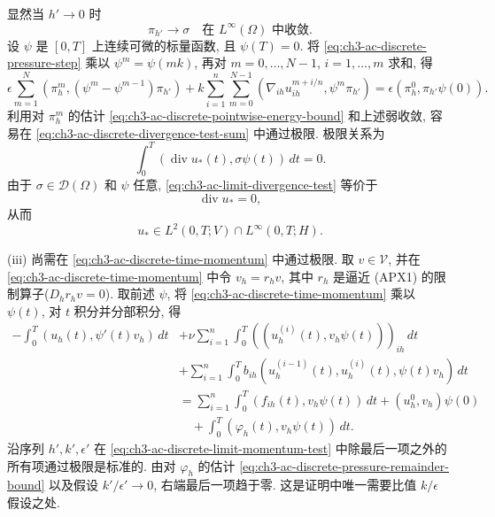 \begin{Proof}
\hypertarget{chapter-03-page-324}{}
显然当 $h'\to0$ 时
\begin{equation}
\pi_{h'}\longrightarrow\sigma
\quad\text{在 }L^\infty(\Omega)\text{ 中收敛}.
\label{eq:ch3-ac-test-pressure-convergence}
\end{equation}
设 $\psi$ 是 $[0,T]$ 上连续可微的标量函数, 且 $\psi(T)=0$. 将 \eqref{eq:ch3-ac-discrete-pressure-step} 乘以 $\psi^m=\psi(mk)$, 再对 $m=0,\ldots,N-1$, $i=1,\ldots,m$ 求和, 得
\begin{equation}
\epsilon\sum_{m=1}^N
(\pi_h^m,(\psi^m-\psi^{m-1})\pi_{h'})
+k\sum_{i=1}^n\sum_{m=0}^{N-1}
(\nabla_{ih}u_{ih}^{m+i/n},\psi^m\pi_{h'})
=\epsilon(\pi_h^0,\pi_{h'}\psi(0)).
\label{eq:ch3-ac-discrete-divergence-test-sum}
\end{equation}
利用对 $\pi_h^m$ 的估计 \eqref{eq:ch3-ac-discrete-pointwise-energy-bound} 和上述弱收敛, 容易在 \eqref{eq:ch3-ac-discrete-divergence-test-sum} 中通过极限. 极限关系为
\begin{equation}
\int_0^T(\operatorname{div}u_*(t),\sigma\psi(t))\,dt=0.
\label{eq:ch3-ac-limit-divergence-test}
\end{equation}
由于 $\sigma\in\mathcal D(\Omega)$ 和 $\psi$ 任意, \eqref{eq:ch3-ac-limit-divergence-test} 等价于
\[
\operatorname{div}u_*=0,
\]
从而
\begin{equation}
u_*\in L^2(0,T;V)\cap L^\infty(0,T;H).
\label{eq:ch3-ac-discrete-limit-space}
\end{equation}

(iii) 尚需在 \eqref{eq:ch3-ac-discrete-time-momentum} 中通过极限. 取 $v\in\mathcal V$, 并在 \eqref{eq:ch3-ac-discrete-time-momentum} 中令 $v_h=r_hv$, 其中 $r_h$ 是逼近 (APX1) 的限制算子($D_hr_hv=0$). 取前述 $\psi$, 将 \eqref{eq:ch3-ac-discrete-time-momentum} 乘以 $\psi(t)$, 对 $t$ 积分并分部积分, 得
\begin{equation}
\begin{aligned}
-\int_0^T(u_h(t),\psi'(t)v_h)\,dt
&+\nu\sum_{i=1}^n\int_0^T
((u_h^{(i)}(t),v_h\psi(t)))_{ih}\,dt\\
&+\sum_{i=1}^n\int_0^T
b_{ih}(u_h^{(i-1)}(t),u_h^{(i)}(t),\psi(t)v_h)\,dt\\
&=\sum_{i=1}^n\int_0^T(f_{ih}(t),v_h\psi(t))\,dt
+(u_h^0,v_h)\psi(0)\\
&\quad+\int_0^T(\varphi_h(t),v_h\psi(t))\,dt.
\end{aligned}
\label{eq:ch3-ac-discrete-limit-momentum-test}
\end{equation}
沿序列 $h',k',\epsilon'$ 在 \eqref{eq:ch3-ac-discrete-limit-momentum-test} 中除最后一项之外的所有项通过极限是标准的. 由对 $\varphi_h$ 的估计 \eqref{eq:ch3-ac-discrete-pressure-remainder-bound} 以及假设 $k'/\epsilon'\to0$, 右端最后一项趋于零. 这是证明中唯一需要比值 $k/\epsilon$ 假设之处.


\end{Proof}

